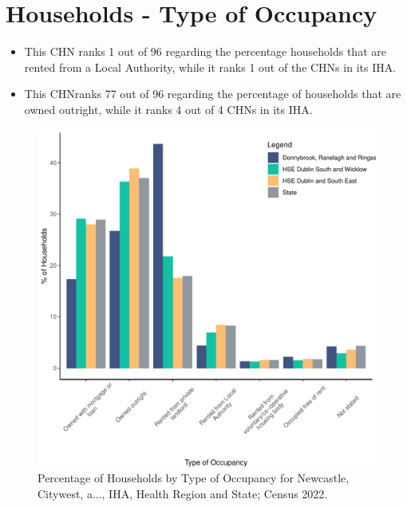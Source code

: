 \documentclass{article}
\begin{document}
\section{Households - Type of Occupancy}\label{sect:Households}
\begin{itemize}
\item This CHN ranks  1 out of 96 regarding the percentage households that are rented from a Local Authority, while it ranks  1 out of the CHNs in its IHA. 
\item This CHNranks  77 out of 96 regarding the percentage of households that are owned outright, while it ranks   4 out of 4 CHNs in its IHA.
\end{itemize}
\begin{figure}[H]
	\centering
	\includegraphics[width = 140mm]{../figures/HouseholdsED.pdf}
	\caption{Percentage of Households by Type of Occupancy for Newcastle, Citywest, a..., IHA, Health Region and State; Census 2022.}
	\label{fig:vbnv}
	\end{figure}
\end{document}
